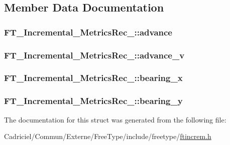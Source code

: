 \subsection{Member Data Documentation}
\hypertarget{struct_f_t___incremental___metrics_rec___a996c99aa0e6b36c2c7776fc1a2b6b614}{
\subsubsection[{advance}]{ F\-T\-\_\-\-Incremental\-\_\-\-Metrics\-Rec\-\_\-\-::advance}}\label{struct_f_t___incremental___metrics_rec___a996c99aa0e6b36c2c7776fc1a2b6b614}
\hypertarget{struct_f_t___incremental___metrics_rec___a0ee280662a03ea935dbfe377e56f4d6d}{
\subsubsection[{advance\-\_\-v}]{ F\-T\-\_\-\-Incremental\-\_\-\-Metrics\-Rec\-\_\-\-::advance\-\_\-v}}\label{struct_f_t___incremental___metrics_rec___a0ee280662a03ea935dbfe377e56f4d6d}
\hypertarget{struct_f_t___incremental___metrics_rec___af065d998d0a0f2a57513125038d802a6}{
\subsubsection[{bearing\-\_\-x}]{ F\-T\-\_\-\-Incremental\-\_\-\-Metrics\-Rec\-\_\-\-::bearing\-\_\-x}}\label{struct_f_t___incremental___metrics_rec___af065d998d0a0f2a57513125038d802a6}
\hypertarget{struct_f_t___incremental___metrics_rec___af1443aa7c1ca54d3c2a29f1cf6d7848b}{
\subsubsection[{bearing\-\_\-y}]{ F\-T\-\_\-\-Incremental\-\_\-\-Metrics\-Rec\-\_\-\-::bearing\-\_\-y}}\label{struct_f_t___incremental___metrics_rec___af1443aa7c1ca54d3c2a29f1cf6d7848b}


The documentation for this struct was generated from the following file\-:\begin{DoxyCompactItemize}
\item 
Cadriciel/\-Commun/\-Externe/\-Free\-Type/include/freetype/\hyperlink{ftincrem_8h}{ftincrem.\-h}\end{DoxyCompactItemize}
